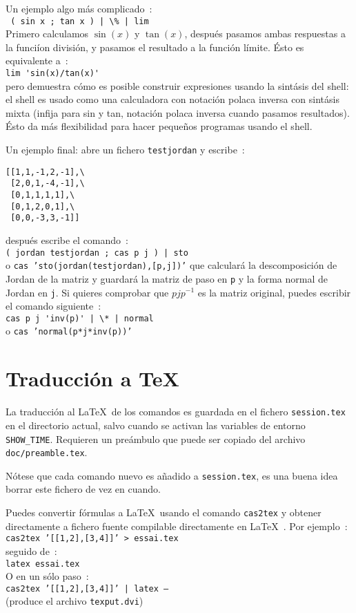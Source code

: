 \documentclass{article}
\begin{document}
Un ejemplo algo m\'as complicado~:\\
\verb? ( sin x ; tan x ) | \% | lim?\\
Primero calculamos $\sin(x)$ y $\tan(x)$, despu\'es pasamos ambas respuestas a la funci\'ion divisi\'on, y pasamos el resultado a la funci\'on l\'imite.
\'Esto es equivalente a~:\\
\verb|lim 'sin(x)/tan(x)'|\\
pero demuestra c\'omo es posible construir expresiones usando la sint\'asis del shell: el shell es usado como una calculadora con notaci\'on polaca inversa con sint\'asis mixta (infija para sin y tan, notaci\'on polaca inversa cuando pasamos resultados).
\'Esto da m\'as flexibilidad para hacer peque\~nos programas usando el shell.

Un ejemplo final: abre un fichero {\tt testjordan} y escribe~:
\begin{verbatim}
[[1,1,-1,2,-1],\
 [2,0,1,-4,-1],\
 [0,1,1,1,1],\
 [0,1,2,0,1],\
 [0,0,-3,3,-1]]
\end{verbatim}
despu\'es escribe el comando~:\\
{\tt ( jordan testjordan ; cas p j ) | sto }\\
o {\tt cas 'sto(jordan(testjordan),[p,j])'}
que calcular\'a la descomposici\'on de Jordan de la matriz y guardar\'a la matriz de paso en {\tt p} y la forma normal de Jordan en {\tt j}.
Si quieres comprobar que $p j p^{-1}$ es la matriz original,
puedes escribir el comando siguiente~:\\
\verb?cas p j 'inv(p)' | \* | normal ?\\
o {\tt cas 'normal(p*j*inv(p))'}

\section{Traducci\'on a \TeX\ }
La traducci\'on al \LaTeX\ de los comandos es guardada en el fichero
{\tt session.tex} en el directorio actual, salvo cuando se activan las 
variables de entorno \verb|SHOW_TIME|. Requieren un pre\'ambulo que puede ser copiado del archivo {\tt doc/preamble.tex}.

N\'otese que cada comando nuevo es a\~nadido a {\tt session.tex}, es una buena idea borrar este fichero de vez en cuando.

Puedes convertir f\'ormulas a \LaTeX\ usando el comando {\tt cas2tex} y obtener directamente a fichero fuente compilable directamente en \LaTeX\ .
Por ejemplo~:\\
{\tt cas2tex '[[1,2],[3,4]]' > essai.tex}\\
seguido de~:\\
{\tt latex essai.tex}\\
O en un s\'olo paso~:\\
{\tt cas2tex '[[1,2],[3,4]]' | latex --}\\
(produce el archivo {\tt texput.dvi})
\end{document}

